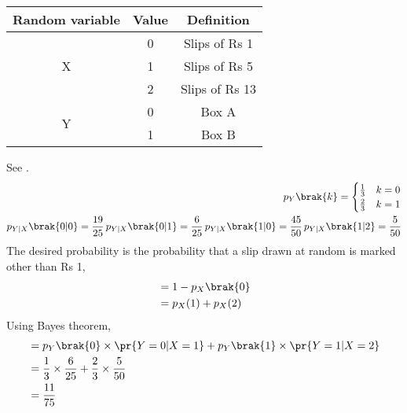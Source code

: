 \begin{table}[H]
	\centering
\begin{tabular}{|c|c|c|}
\hline
Random variable &Value &Definition\\ \hline
\multirow{3}{*}{X} &0 &Slips of Rs 1\\
&1 &Slips of Rs 5\\
&2 &Slips of Rs 13\\ \hline
\multirow{2}{*}{Y} &0 &Box A\\
&1 &Box B\\\hline
\end{tabular}
\caption{}
\label{tab:Distribution}
\end{table}
See .
\begin{align}
p_{Y}\brak{k}= \begin{cases} 
      \frac{1}{3} & {k=0} \\
      \frac{2}{3 }& {k=1} 
   \end{cases}
   \\
p_{Y|X}\brak{0|0} = \frac{19}{25}\, 
p_{Y|X}\brak{0|1} = \frac{6}{25}\,
p_{Y|X}\brak{1|0} = \frac{45}{50}\,
p_{Y|X}\brak{1|2} = \frac{5}{50}
\end{align}
The desired probability is the probability that a slip drawn at random is marked other than Rs 1,
\begin{align}
&=1-p_X\brak{0}\\
&= p_X(1) + p_X(2)
\end{align}
Using Bayes theorem,
\begin{align}
&= p_Y\brak{0} \times \pr{Y=0 | X=1} + p_Y\brak{1} \times \pr{Y=1|X=2}\\
&=\frac{1}{3} \times \frac{6}{25} + \frac{2}{3} \times \frac{5}{50}\\
&=\frac{11}{75}
\end{align}

\newpage


\bigskip

\renewcommand{\thefigure}{\theenumi}
\renewcommand{\thetable}{\theenumi}

%

